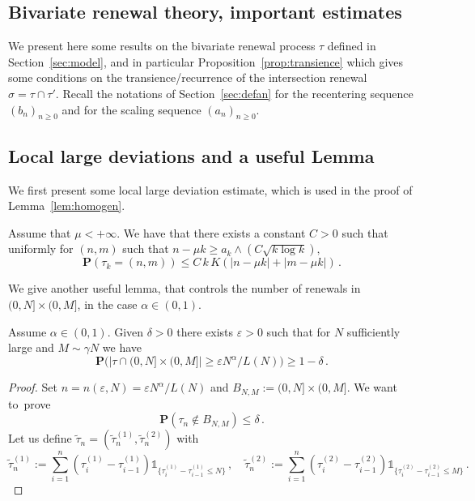 \documentclass[AHL,Unicode,longabstracts]{cedram}
\newcommand{\ga}{\alpha}
\newcommand{\gep}{\varepsilon}
\newcommand{\unbf}%
{\mathds{1}}
\renewcommand{\tilde}{\widetilde}
\newcommand{\bP}{\ensuremath{\mathbf{P}}}
\begin{document}
\begin{appendix}
\section{Bivariate renewal theory, important estimates}\label{app:bivrenewal}

We present here some results on the bivariate renewal process $\tau$ defined in Section~\ref{sec:model}, and in particular Proposition~\ref{prop:transience} which gives some conditions on the transience/recurrence of the intersection renewal $\sigma=\tau\cap\tau'$. Recall the notations of Section~\ref{sec:defan} for the recentering sequence $(b_n)_{n\geq 0}$ and for the scaling sequence $(a_n)_{n\geq 0}$.


\subsection{Local large deviations and a useful Lemma}

We first present some local large deviation estimate, which is used in the proof of Lemma~\ref{lem:homogen}.

\begin{theo}[{\cite[Theorem~2.4]{cf:B}}]\label{thm:locallargedev}
Assume that $\mu<+\infty$. We have that there exists a constant $C>0$ such that uniformly for $(n,m)$ such that $n - \mu k \geq a_k \wedge (C\sqrt{k\log k}),$
\[
\bP(\tau_k =(n,m)) \leq C\,k\,K(|n-\mu k| + |m-\mu k|)\,.
\]
\end{theo}

We give another useful lemma, that controls the number of renewals in $(0,N]\times(0,M]$, in the case $\ga\in(0,1)$.

\begin{lemm}\label{th:limp}
Assume $\ga\in(0,1)$. Given $\delta>0$ there exists $\gep>0$ such that for $N$ sufficiently large and $M \sim \gamma N$ we have
\begin{equation}
\bP \big(\vert \tau \cap (0,N] \times (0,M] \vert \ge \gep N^{\ga}/L(N) \big) \ge 1- \delta\,.
\end{equation}
\end{lemm}

\begin{proof}
Set $n = n(\gep,N) = \gep N^{\ga}/L(N)$ and $B_{N,M} := (0,N]\times (0,M]$. We want to~prove
\begin{equation}
\bP \left(\tau_n \notin B_{N,M} \right) \le \delta\,.
\end{equation}
Let us define $\tilde \tau_n = (\tilde \tau_n^{(1)},\tilde \tau_n^{(2)})$ with
\begin{equation}
\tilde{\tau}^{(1)}_n := \sum_{i=1}^n (\tau_i^{(1)} - \tau_{i-1}^{(1)}) \unbf_{ \lbrace \tau_i^{(1)} - \tau_{i-1}^{(1)} \le N \rbrace}\,,\quad
\tilde{\tau}^{(2)}_n := \sum_{i=1}^n (\tau_i^{(2)} - \tau_{i-1}^{(2)}) \unbf_{ \lbrace \tau_i^{(2)} - \tau_{i-1}^{(2)} \le M \rbrace}\,.
\end{equation}


\end{proof}
\end{appendix}
\end{document}
